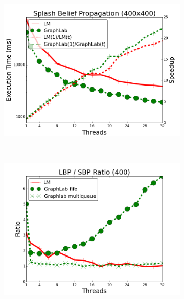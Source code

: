 \begin{figure}[]
        \centering
        \begin{subfigure}[b]{\plotsize\textwidth}
        \includegraphics[width=\textwidth]{experiments/threads/cmp-splash-bp-400.png}
           \label{fig:threads:results_splash_final}
        \end{subfigure}~ ~
        \begin{subfigure}[b]{\plotsize\textwidth}
           \includegraphics[width=\textwidth]{experiments/threads/cmp-ratio-belief-propagation-400.png}
           \label{fig:threads:splash_ratio_fifo}
        \end{subfigure}\\
        \label{fig:threads:results_splash_ratio}
\end{figure}
